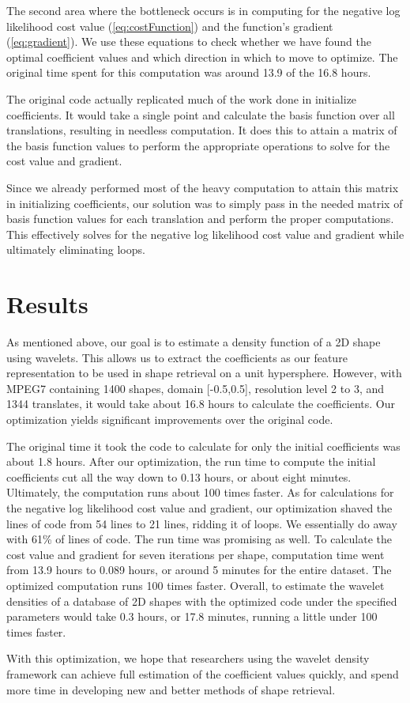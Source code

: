\documentclass[../tech_report_1.tex]{subfiles}
\begin{document}
The second area where the bottleneck occurs is in computing for the
negative log likelihood cost value (\ref{eq:costFunction}) and the
function's gradient (\ref{eq:gradient}). We use these equations to
check whether we have found the  optimal coefficient values and
which direction in which to move to optimize. The original time spent for this
computation was around 13.9 of the 16.8 hours. 

The original code actually replicated much of the work done in initialize coefficients. It would take a single point and calculate the basis
function over all translations, resulting in needless computation.
It does this to attain a matrix of the basis function values to perform
the appropriate operations to solve for the cost value and gradient. 

Since we already performed most of the heavy computation to attain
this matrix in initializing coefficients, our solution was to simply
pass in the needed matrix of basis function values for each translation
and perform the proper computations. This effectively solves for the
negative log likelihood cost value and gradient while ultimately eliminating
loops. 

\section{Results}

As mentioned above, our goal is to estimate a density function of
a 2D shape using wavelets. This allows us to extract the coefficients
as our feature representation to be used in shape retrieval on a unit
hypersphere. However, with MPEG7 containing 1400 shapes, domain {[}-0.5,0.5{]},
resolution level 2 to 3, and 1344 translates, it would take about 16.8
hours to calculate the coefficients. Our optimization yields significant improvements over the original code.

The original time it took the code to calculate for only the initial
coefficients was about 1.8 hours. After our optimization, the run
time to compute the initial coefficients cut all the way down to 0.13
hours, or about eight minutes. Ultimately, the computation runs about 100 times
faster. As for calculations for the negative log likelihood cost value
and gradient, our optimization shaved the lines of code from 54 lines
to 21 lines, ridding it of loops. We essentially do away with 61\%
of lines of code. The run time was promising as well. To calculate
the cost value and gradient for seven iterations per shape, computation time
went from 13.9 hours to 0.089 hours, or around 5 minutes for the entire
dataset. The optimized computation runs 100 times faster. Overall, to estimate
the wavelet densities of a database of 2D shapes with the optimized
code under the specified parameters would take 0.3 hours, or 17.8
minutes, running a little under 100 times faster.

With this optimization, we hope that researchers using the wavelet density framework can achieve full estimation of the coefficient values quickly, and spend more
time in developing new and better methods of shape retrieval.
\end{document}
